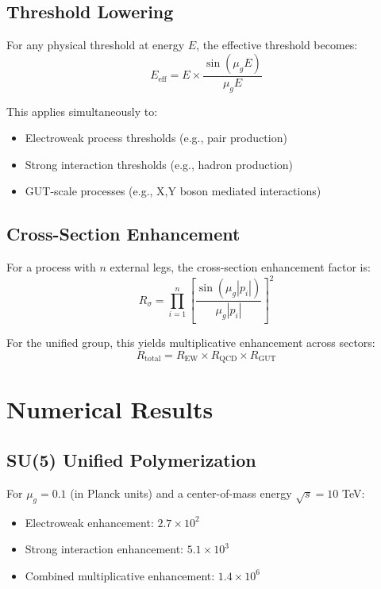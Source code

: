 \documentclass[11pt]{article}
\begin{document}
\subsection{Threshold Lowering}
For any physical threshold at energy $E$, the effective threshold becomes:
\begin{equation}
E_{\text{eff}} = E \times \frac{\sin(\mu_g E)}{\mu_g E}
\end{equation}

This applies simultaneously to:
\begin{itemize}
    \item Electroweak process thresholds (e.g., pair production)
    \item Strong interaction thresholds (e.g., hadron production)
    \item GUT-scale processes (e.g., X,Y boson mediated interactions)
\end{itemize}

\subsection{Cross-Section Enhancement}
For a process with $n$ external legs, the cross-section enhancement factor is:
\begin{equation}
R_{\sigma} = \prod_{i=1}^{n} \left[\frac{\sin(\mu_g |p_i|)}{\mu_g |p_i|}\right]^2
\end{equation}

For the unified group, this yields multiplicative enhancement across sectors:
\begin{equation}
R_{\text{total}} = R_{\text{EW}} \times R_{\text{QCD}} \times R_{\text{GUT}}
\end{equation}

\section{Numerical Results}

\subsection{SU(5) Unified Polymerization}
For $\mu_g = 0.1$ (in Planck units) and a center-of-mass energy $\sqrt{s} = 10$ TeV:
\begin{itemize}
    \item Electroweak enhancement: $2.7 \times 10^2$
    \item Strong interaction enhancement: $5.1 \times 10^3$
    \item Combined multiplicative enhancement: $1.4 \times 10^6$
\end{itemize}
\end{document}
